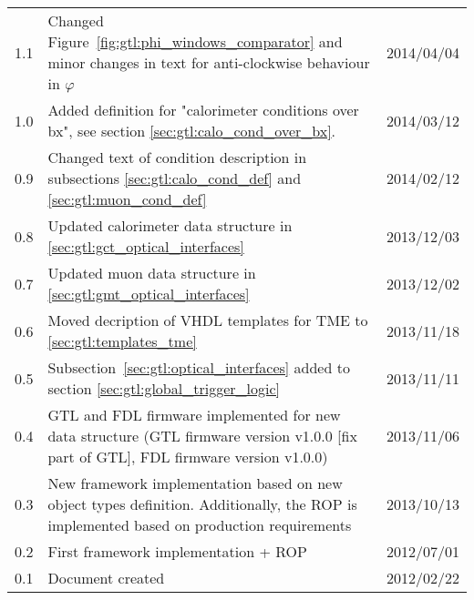 \begin{longtable}{|c|p{}|c|}
1.1 & Changed Figure~\ref{fig:gtl:phi_windows_comparator} and minor changes in text for anti-clockwise behaviour in $\varphi$ & 2014/04/04\\
1.0 & Added definition for "calorimeter conditions over bx", see section \ref{sec:gtl:calo_cond_over_bx}. & 2014/03/12\\ 
0.9 & Changed text of condition description in subsections \ref{sec:gtl:calo_cond_def} and \ref{sec:gtl:muon_cond_def} & 2014/02/12\\
0.8 & Updated calorimeter data structure in \ref{sec:gtl:gct_optical_interfaces} & 2013/12/03\\
0.7 & Updated muon data structure in \ref{sec:gtl:gmt_optical_interfaces} & 2013/12/02\\
0.6 & Moved decription of VHDL templates for TME to \ref{sec:gtl:templates_tme} & 2013/11/18\\
0.5 & Subsection~\ref{sec:gtl:optical_interfaces} added to section \ref{sec:gtl:global_trigger_logic} & 2013/11/11\\
0.4 & GTL and FDL firmware implemented for new data structure (GTL firmware version v1.0.0 [fix part of GTL], FDL firmware version v1.0.0) & 2013/11/06\\
0.3 & New framework implementation based on new object types definition. Additionally, the ROP is implemented based on production requirements & 2013/10/13\\
0.2 & First framework implementation + ROP  & 2012/07/01\\
0.1 & Document created & 2012/02/22\\
\hline
\end{longtable}

\clearpage{}
